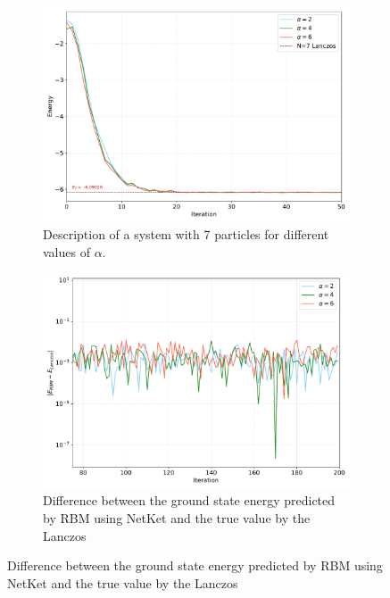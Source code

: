 \documentclass[a4paper,11pt]{article}
\begin{document}
\begin{figure}[htb]
    \centering 
    \caption{NetKet RBM implementation results.}
    \label{fig:NetKet}
    \begin{subfigure}[t]{0.45\textwidth}
        \centering
        \includegraphics[width=\textwidth]{./figure/Comparison_energy_N_7_NetKet}
        \caption{Description of a system with 7 particles for different values of $\alpha$.}
        \label{fig:alpha}
    \end{subfigure} 
    \begin{subfigure}[t]{0.45\textwidth} 
        \centering
        \includegraphics[width=\textwidth]{./figure/Comparison_N_7_difference_logscale_NET.pdf}
        \caption{Difference between the ground state energy predicted by RBM using NetKet and the true value by the Lanczos}
        \label{fig:Net_diff}

\end{subfigure}
\end{figure}
\end{document}
